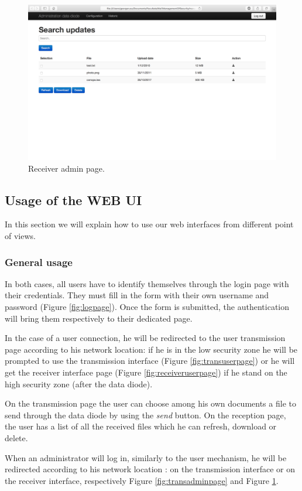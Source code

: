 \documentclass[a4paper,10pt]{article}
\begin{document}
\begin{figure}[!h]
\centering
\includegraphics[scale=0.35]{images/adminreceiver.png}
\caption{Receiver admin page.}
\label{fig:receiveradminpage}
\end{figure}
\clearpage
\subsection{Usage of the WEB UI}
In this section we will explain how to use our web interfaces from different point of views.
\subsubsection{General usage}
In both cases, all users have to identify themselves through the login page with their credentials. They must fill in the form with their own username and password (Figure \ref{fig:logpage}). Once the form is submitted, the authentication will bring them respectively to their dedicated page.\bigskip 

In the case of a user connection, he will be redirected to the user transmission page according to his network location: if he is in the low security zone he will be prompted to use the transmission interface (Figure \ref{fig:transuserpage}) or he will get the receiver interface page (Figure \ref{fig:receiveruserpage}) if he stand on the high security zone (after the data diode). 

On the transmission page the user can choose among his own documents a file to send through the data diode by using the \textit{send} button. On the reception page, the user has a list of all the received files which he can refresh, download or delete.\bigskip 

When an administrator will log in, similarly to the user mechanism, he will be redirected according to his network location : on the transmission interface or on the receiver interface, respectively Figure \ref{fig:transadminpage} and Figure \ref{fig:receiveradminpage}.
\end{document}
